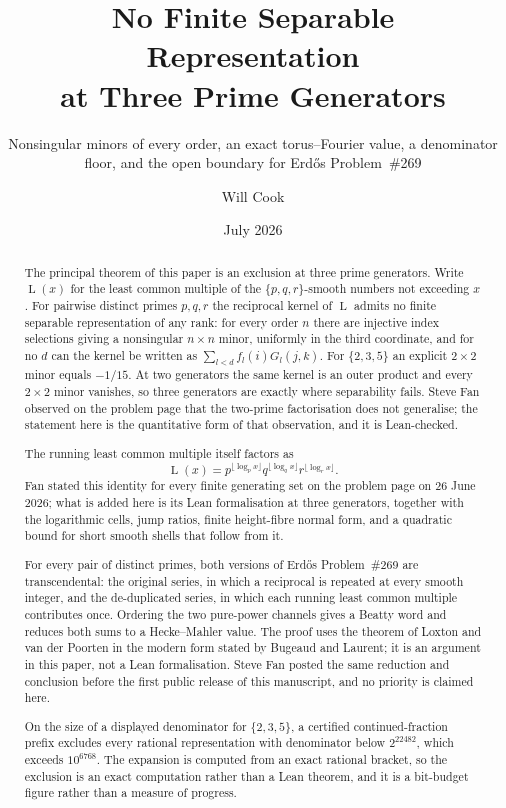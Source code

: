 \documentclass[11pt]{article}
\title{No Finite Separable Representation\\at Three Prime Generators}
\subtitle{Nonsingular minors of every order, an exact torus--Fourier value, a
denominator floor, and the open boundary for Erd\H{o}s Problem~\#269}
\author{Will Cook}
\date{July 2026}
\newcommand{\Lprefix}{\operatorname{L}}
\begin{document}
\maketitle
\noteprovenance

\begin{abstract}
\noindent
The principal theorem of this paper is an exclusion at three prime generators.
Write \(\Lprefix(x)\) for the least common multiple of the
\(\{p,q,r\}\)-smooth numbers not exceeding \(x\).  For pairwise distinct
primes \(p,q,r\) the reciprocal kernel of \(\Lprefix\) admits no finite
separable representation of any rank: for every order \(n\) there are
injective index selections giving a nonsingular \(n\times n\) minor, uniformly
in the third coordinate, and for no \(d\) can the kernel be written as
\(\sum_{l<d}f_l(i)G_l(j,k)\).  For \(\{2,3,5\}\) an explicit \(2\times2\)
minor equals \(-1/15\).  At two generators the same kernel is an outer
product and every \(2\times2\) minor vanishes, so three generators are exactly
where separability fails.  Steve Fan observed on the problem page that the
two-prime factorisation does not generalise; the statement here is the
quantitative form of that observation, and it is Lean-checked.

The running least common multiple itself factors as
\[
 \Lprefix(x)=p^{\lfloor\log_p x\rfloor}
             q^{\lfloor\log_q x\rfloor}
             r^{\lfloor\log_r x\rfloor}.
\]
Fan stated this identity for every finite generating set on the problem page
on 26 June 2026; what is added here is its Lean formalisation at three
generators, together with the logarithmic cells, jump ratios, finite
height-fibre normal form, and a quadratic bound for short smooth shells that
follow from it.

For every pair of distinct primes, both versions of Erd\H{o}s
Problem~\#269 are transcendental: the original series, in which a reciprocal
is repeated at every smooth integer, and the de-duplicated series, in which
each running least common multiple contributes once.  Ordering the two
pure-power channels gives a Beatty word and reduces both sums to a
Hecke--Mahler value.  The proof uses the theorem of Loxton and van der Poorten
in the modern form stated by Bugeaud and Laurent; it is an argument in this
paper, not a Lean formalisation.  Steve Fan posted the same reduction and
conclusion before the first public release of this manuscript, and no priority
is claimed here.

On the size of a displayed denominator for \(\{2,3,5\}\), a certified
continued-fraction prefix excludes every rational representation with
denominator below \(2^{22482}\), which exceeds \(10^{6768}\).  The expansion
is computed from an exact rational bracket, so the exclusion is an exact
computation rather than a Lean theorem, and it is a bit-budget figure rather
than a measure of progress.


\end{abstract}
\end{document}

